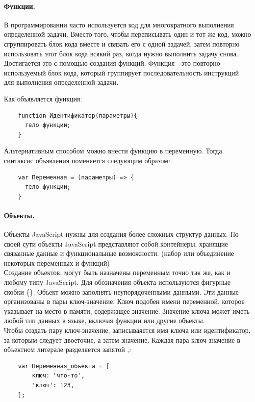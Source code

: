 \documentclass[14pt,Diplom]{diplomwork}
\begin{document}
\paragraph{Функции.}
 В программировании часто используется код для многократного выполнения определенной задачи. Вместо того, чтобы переписывать один и тот же код, можно сгруппировать блок кода вместе и связать его с одной задачей, затем повторно использовать этот блок кода всякий раз, когда нужно выполнить задачу снова. Достигается это с помощью создания функций. Функция - это повторно используемый блок кода, который группирует последовательность инструкций для выполнения определенной задачи.
 
 Как объявляется функция:
 \begin{verbatim} 
 	function Идентификатор(параметры){
 	  тело функции;
 	}
 \end{verbatim} 
 Альтернативным способом можно внести функцию в переменную. Тогда синтаксис объявления поменяется следующим образом:
 \begin{verbatim} 
 	var Переменная = (параметры) => {
 	  тело функции;
 	}
 \end{verbatim} 
  
\paragraph{Объекты.} 
Объекты JavaScript нужны для создания более сложных структур данных. По своей сути объекты JavaScript представляют собой контейнеры, хранящие связанные данные и функциональные возможности. (набор или
объединение некоторых переменных и функций)\\

Создание объектов, могут быть назначены переменным точно так же, как и любому типу JavaScript. Для обозначения объекта используются фигурные скобки \{\}. Объект можно заполнять неупорядоченными данными. Эти данные организованы в пары ключ-значение. Ключ подобен имени переменной, которое указывает на место в памяти, содержащее значение. Значение ключа может иметь любой тип данных в языке, включая функции или другие объекты.\\

Чтобы создать пару ключ-значение, записываяется имя ключа или идентификатор, за которым следует двоеточие, а затем значение. Каждая пара ключ-значение в объектном литерале разделяется запятой ,:
\begin{verbatim} 
	var Переменная_объекта = {
		ключ: 'что-то',
		'ключ': 123,
	};
\end{verbatim} 
\end{document}
